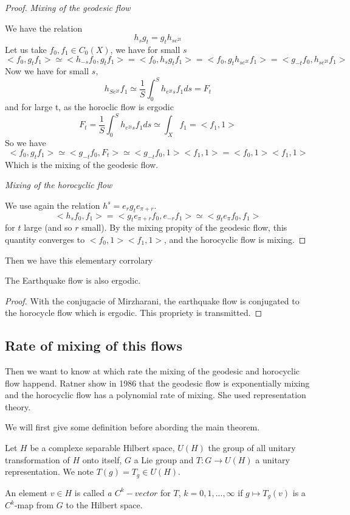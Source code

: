 \begin{proof}
\emph{Mixing of the geodesic flow}

We have the relation \[
h_s g_t =g_t h_{s e^{2t}}
\]
Let us take $f_0,f_1 \in C_0(X)$,
we have for small $s$ %
\[
<f_0,g_t f_1 > \simeq <h_{-s} f_0,g_t f_1 >=<f_0 , h_s g_t f_1 >
= <f_0 , g_t h_{s e^{2t}} f_1 > = <g_{-t} f_0 , h_{s e^{2t}}f_1>
\]
Now we have for small $s$, \[
h_{S e^{2t}}f_1 \simeq \frac{1}{S} \int_0^S h_{e^{2t}s} f_1 ds =F_t
\]
and for large t, as the horoclic flow is ergodic \[
F_t = \frac{1}{S} \int_0^S h_{e^{2t}s} f_1 ds \simeq \int_X f_1 = <f_1 , 1 >
\]
So we have \[
<f_0, g_t f_1 > \simeq <g_{-t} f_0, F_t > \simeq <g_{-t} f_0 ,1 ><f_1,1> = <f_0,1><f_1,1>
\]
Which is the mixing of the geodesic flow.

\emph{Mixing of the horocyclic flow}

We use again the relation $h^s = e_r g_t e_{\pi + r}$. \[
<h_s f_0 , f_1 > = < g_t  e_{\pi+r} f_0, e_{-r} f_1> \simeq <g_t e_{\pi} f_0, f_1>
\]
for $t$ large (and so $r$ small). By the mixing propity of the geodesic flow, this quantity converges to $<f_0,1><f_1,1>$, and the horocyclic flow is mixing.

\end{proof}


Then we have this elementary corrolary

\begin{cor}
The Earthquake flow is also ergodic.
\end{cor}

\begin{proof}
With the conjugacie of Mirzharani, the earthquake flow is conjugated to the horocycle flow which is ergodic. This propriety is transmitted.
\end{proof}

\subsection{Rate of mixing of this flows}

Then we want to know at which rate the mixing of the geodesic and horocyclic flow happend. Ratner show in 1986 \cite{ratner_1987} that the geodesic flow is exponentially mixing and the horocyclic flow has a polynomial rate of mixing. She used representation theory.

We will first give some definition before abording the main theorem.

\begin{dfnt}
Let $H$ be a  complexe separable Hilbert space, $U(H)$ the group of all unitary transformation of $H$ onto itself, $G$ a Lie group and $T: G \to U(H)$ a unitary representation. We note $T(g)=T_g \in U(H)$.

An element $v \in H$ is called \emph{a $C^k-vector$} for $T$, $k=0,1,...,\infty$ if $g \mapsto T_g(v)$ is a $C^k$-map from $G$ to the Hilbert space.
\end{dfnt}

